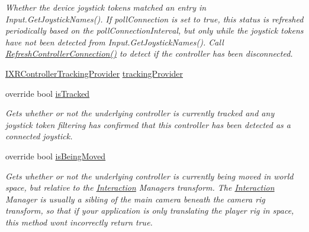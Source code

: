 \begin{DoxyCompactItemize}
\begin{DoxyCompactList}\small\item\em Whether the device joystick tokens matched an entry in Input.\+Get\+Joystick\+Names(). If poll\+Connection is set to true, this status is refreshed periodically based on the poll\+Connection\+Interval, but only while the joystick tokens have not been detected from Input.\+Get\+Joystick\+Names(). Call \mbox{\hyperlink{class_leap_1_1_unity_1_1_interaction_1_1_interaction_x_r_controller_a84947d3cd2c236dab7849e2d805465b6}{Refresh\+Controller\+Connection()}} to detect if the controller has been disconnected. \end{DoxyCompactList}\item 
\mbox{\hyperlink{interface_leap_1_1_unity_1_1_interaction_1_1_i_x_r_controller_tracking_provider}{I\+X\+R\+Controller\+Tracking\+Provider}} \mbox{\hyperlink{class_leap_1_1_unity_1_1_interaction_1_1_interaction_x_r_controller_aebc2b694592123f75013dd012e8f357f}{tracking\+Provider}}
\item 
override bool \mbox{\hyperlink{class_leap_1_1_unity_1_1_interaction_1_1_interaction_x_r_controller_ab5d50597383ad3e552e3c16d1e91e5a7}{is\+Tracked}}
\begin{DoxyCompactList}\small\item\em Gets whether or not the underlying controller is currently tracked and any joystick token filtering has confirmed that this controller has been detected as a connected joystick. \end{DoxyCompactList}\item 
override bool \mbox{\hyperlink{class_leap_1_1_unity_1_1_interaction_1_1_interaction_x_r_controller_a362ab5e9ffb5ac5046a869668670b40c}{is\+Being\+Moved}}
\begin{DoxyCompactList}\small\item\em Gets whether or not the underlying controller is currently being moved in world space, but relative to the \mbox{\hyperlink{namespace_leap_1_1_unity_1_1_interaction}{Interaction}} Manager\textquotesingle{}s transform. The \mbox{\hyperlink{namespace_leap_1_1_unity_1_1_interaction}{Interaction}} Manager is usually a sibling of the main camera beneath the camera rig transform, so that if your application is only translating the player rig in space, this method won\textquotesingle{}t incorrectly return true. \end{DoxyCompactList}\item 

\end{DoxyCompactItemize}
